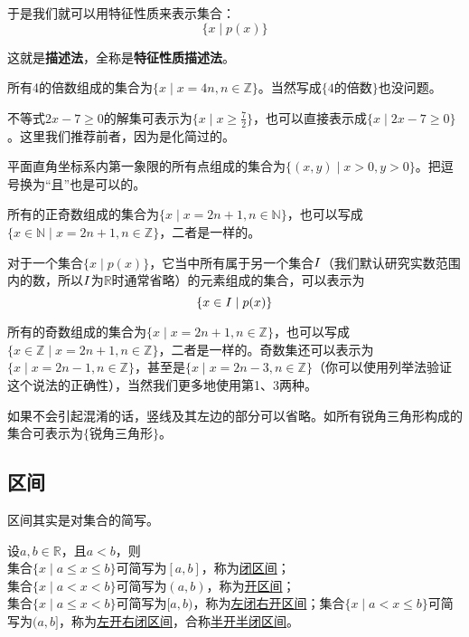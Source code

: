 \documentclass[lang=cn,math=cm,chinesefont=nofont,11pt,scheme=chinese]{elegantbook}
\begin{document}
于是我们就可以用特征性质来表示集合：$$\{x\mid p(x)\}$$

这就是\textbf{描述法}，全称是\textbf{特征性质描述法}。

\begin{example}
  所有4的倍数组成的集合为$\{x\mid x=4n,n\in\mathbb{Z}\}$。当然写成$\{\text{4的倍数}\}$也没问题。
\end{example}

\begin{example}
  不等式$2x-7\geq 0$的解集可表示为$\{x\mid x\geq\frac{7}{2}\}$，也可以直接表示成$\{x\mid 2x-7\geq 0\}$。这里我们推荐前者，因为是化简过的。
\end{example}

\begin{example}
  平面直角坐标系内第一象限的所有点组成的集合为$\{(x,y)\mid x>0,y>0\}$。把逗号换为“且”也是可以的。
\end{example}

\begin{example}
  所有的正奇数组成的集合为$\{x\mid x=2n+1,n\in\mathbb{N}\}$，也可以写成$\{x\in\mathbb{N}\mid x=2n+1,n\in\mathbb{Z}\}$，二者是一样的。
\end{example}

\begin{remark}
  对于一个集合$\{x\mid p(x)\}$，它当中所有属于另一个集合$\boldmath{I}$（我们默认研究实数范围内的数，所以$\boldmath{I}$为$\mathbb{R}$时通常省略）的元素组成的集合，可以表示为$$\{x\in\boldmath{I}\mid p(x)\}$$
\end{remark}

\begin{example}
  所有的奇数组成的集合为$\{x\mid x=2n+1,n\in\mathbb{Z}\}$，也可以写成$\{x\in\mathbb{Z}\mid x=2n+1,n\in\mathbb{Z}\}$，二者是一样的。奇数集还可以表示为$\{x\mid x=2n-1,n\in\mathbb{Z}\}$，甚至是$\{x\mid x=2n-3,n\in\mathbb{Z}\}$（你可以使用列举法验证这个说法的正确性），当然我们更多地使用第1、3两种。
\end{example}

如果不会引起混淆的话，竖线及其左边的部分可以省略。如所有锐角三角形构成的集合可表示为$\{\text{锐角三角形}\}$。

\subsection{区间}
区间其实是对集合的简写。
\begin{definition}[区间]
	设$a,b\in\mathbb{R}$，且$a<b$，则\\集合$\{x\mid a\leq x\leq b\}$可简写为$[a,b]$，称为\underline{闭区间}；\\集合$\{x\mid a<x<b\}$可简写为$(a,b)$，称为\underline{开区间}；\\集合$\{x\mid a\leq x<b\}$可简写为$[a,b)$，称为\underline{左闭右开区间}；集合$\{x\mid a< x\leq b\}$可简写为$(a,b]$，称为\underline{左开右闭区间}，合称\underline{半开半闭区间}。
\end{definition}
\end{document}
